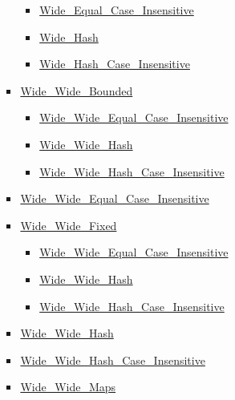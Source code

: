\begin{multicols*}{\columnnr}
\begin{scriptsize}
\begin{itemize}[leftmargin=0mm]
\begin{itemize}[leftmargin=5mm]
\begin{itemize}[leftmargin=5mm]
	  \begin{itemize}[leftmargin=5mm]
	  \item[] \href{http://www.ada-auth.org/standards/22rm/html/RM-A-4-7.html}{Wide\_Equal\_Case\_Insensitive}
	  \item[] \href{http://www.ada-auth.org/standards/22rm/html/RM-A-4-7.html}{Wide\_Hash}
	  \item[] \href{http://www.ada-auth.org/standards/22rm/html/RM-A-4-7.html}{Wide\_Hash\_Case\_Insensitive}
	  \end{itemize}
	\item[] \href{http://www.ada-auth.org/standards/22rm/html/RM-A-4-8.html}{Wide\_Wide\_Bounded}
	  \begin{itemize}[leftmargin=5mm]
	  \item[] \href{http://www.ada-auth.org/standards/22rm/html/RM-A-4-8.html}{Wide\_Wide\_Equal\_Case\_Insensitive}
	  \item[] \href{http://www.ada-auth.org/standards/22rm/html/RM-A-4-8.html}{Wide\_Wide\_Hash}
	  \item[] \href{http://www.ada-auth.org/standards/22rm/html/RM-A-4-8.html}{Wide\_Wide\_Hash\_Case\_Insensitive}
	  \end{itemize}
	\item[] \href{http://www.ada-auth.org/standards/22rm/html/RM-A-4-8.html}{Wide\_Wide\_Equal\_Case\_Insensitive}
	\item[] \href{http://www.ada-auth.org/standards/22rm/html/RM-A-4-8.html}{Wide\_Wide\_Fixed}
	  \begin{itemize}[leftmargin=5mm]
	  \item[] \href{http://www.ada-auth.org/standards/22rm/html/RM-A-4-8.html}{Wide\_Wide\_Equal\_Case\_Insensitive}
	  \item[] \href{http://www.ada-auth.org/standards/22rm/html/RM-A-4-8.html}{Wide\_Wide\_Hash}
	  \item[] \href{http://www.ada-auth.org/standards/22rm/html/RM-A-4-8.html}{Wide\_Wide\_Hash\_Case\_Insensitive}
	  \end{itemize}
	\item[] \href{http://www.ada-auth.org/standards/22rm/html/RM-A-4-8.html}{Wide\_Wide\_Hash}
	\item[] \href{http://www.ada-auth.org/standards/22rm/html/RM-A-4-8.html}{Wide\_Wide\_Hash\_Case\_Insensitive}
	\item[] \href{http://www.ada-auth.org/standards/22rm/html/RM-A-4-8.html}{Wide\_Wide\_Maps}
	  \begin{itemize}[leftmargin=5mm]

\end{itemize}
\end{itemize}
\end{itemize}
\end{itemize}
\end{scriptsize}
\end{multicols*}
